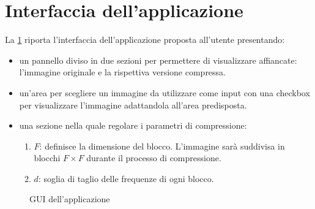 \documentclass[11pt,italian]{article}
\begin{document}
\section{Interfaccia dell'applicazione}
La \cref{fig:application-window} riporta l’interfaccia dell'applicazione proposta all'utente presentando:
\begin{itemize}
    \item un pannello diviso in due sezioni per permettere di visualizzare affiancate: l’immagine originale e la rispettiva versione compressa.
    \item un'area per scegliere un immagine da utilizzare come input con una checkbox per visualizzare l'immagine adattandola all'area predisposta.
    \item una sezione nella quale regolare i parametri di compressione:
    \begin{enumerate}
        \item $F$: definisce la dimensione del blocco. L'immagine sarà suddivisa in blocchi $F\times F$ durante il processo di compressione.
        \item $d$: soglia di taglio delle frequenze di ogni blocco.
    \end{enumerate}
\end{itemize}

\begin{figure}[H]
    \caption{GUI dell'applicazione}
    \label{fig:application-window}
\end{figure}
\end{document}
